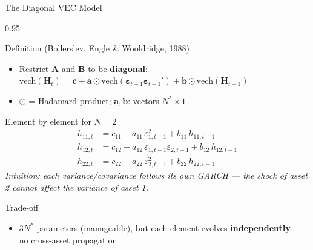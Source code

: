 \documentclass[9pt, aspectratio=169, t]{beamer}
\begin{document}
\begin{frame}{The Diagonal VEC Model}
    \begin{cminipage}{0.95\textwidth}
    \vspace{-3mm}
    {\scriptsize
    \begin{block}{Definition (Bollerslev, Engle \& Wooldridge, 1988)}
        \begin{itemize}\setlength{\itemsep}{0pt}
            \item Restrict $\mathbf{A}$ and $\mathbf{B}$ to be \textbf{diagonal}: $\text{vech}(\mathbf{H}_t) = \mathbf{c} + \mathbf{a} \odot \text{vech}(\boldsymbol{\varepsilon}_{t-1}\boldsymbol{\varepsilon}_{t-1}') + \mathbf{b} \odot \text{vech}(\mathbf{H}_{t-1})$
            \item $\odot$ = Hadamard product; $\mathbf{a}, \mathbf{b}$: vectors $N^* \times 1$
        \end{itemize}
    \end{block}
    \vspace{-1mm}
    \begin{block}{Element by element for $N=2$}
        \vspace{-1mm}
        \begin{align}
            h_{11,t} &= c_{11} + a_{11}\,\varepsilon_{1,t-1}^2 + b_{11}\,h_{11,t-1} \\
            h_{12,t} &= c_{12} + a_{12}\,\varepsilon_{1,t-1}\varepsilon_{2,t-1} + b_{12}\,h_{12,t-1} \\
            h_{22,t} &= c_{22} + a_{22}\,\varepsilon_{2,t-1}^2 + b_{22}\,h_{22,t-1}
        \end{align}
        \vspace{-3mm}
        \textit{Intuition: each variance/covariance follows its own GARCH --- the shock of asset 2 cannot affect the variance of asset 1.}
    \end{block}
    \vspace{-1mm}
    \begin{alertblock}{Trade-off}
        \begin{itemize}\setlength{\itemsep}{0pt}
            \item $3N^*$ parameters (manageable), but each element evolves \textbf{independently} --- no cross-asset propagation
        \end{itemize}
    \end{alertblock}
    }
    \end{cminipage}
\end{frame}
\end{document}

